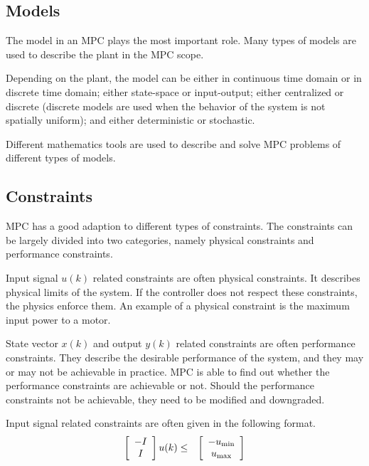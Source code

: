 \subsection{Models}

The model in an MPC plays the most important role. Many types of models are used to describe the plant in the MPC scope. 

Depending on the plant, the model can be either in continuous time domain or in discrete time domain; either state-space or input-output; either centralized or discrete (discrete models are used when the behavior of the system is not spatially uniform); and either deterministic or stochastic.

Different mathematics tools are used to describe and solve MPC problems of different types of models.

\subsection{Constraints}

MPC has a good adaption to different types of constraints. The constraints can be largely divided into two categories, namely physical constraints and performance constraints.

Input signal $u(k)$ related constraints are often physical constraints. It describes physical limits of the system. If the controller does not respect these constraints, the physics enforce them. An example of a physical constraint is the maximum input power to a motor.

State vector $x(k)$ and output $y(k)$ related constraints are often performance constraints. They describe the desirable performance of the system, and they may or may not be achievable in practice. MPC is able to find out whether the performance constraints are achievable or not. Should the performance constraints not be achievable, they need to be modified and downgraded.

Input signal related constraints are often given in the following format.
\begin{eqnarray}
	\left[\begin{array}{c}
		-I \\ I
	\end{array}\right]u(k) &\leq& \left[\begin{array}{c}
	-u_{\textup{min}} \\ u_{\textup{max}}
\end{array}\right] \nonumber
\end{eqnarray}

